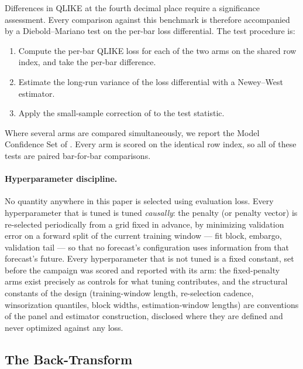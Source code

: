 Differences in QLIKE at the fourth decimal place require a significance
assessment. Every comparison against this benchmark is therefore
accompanied by a Diebold--Mariano test \citep{DieboldMariano1995} on the
per-bar loss differential. The test procedure is:
\begin{enumerate}
    \item Compute the per-bar QLIKE loss for each of the two arms on the
      shared row index, and take the per-bar difference.
    \item Estimate the long-run variance of the loss differential with a
      Newey--West estimator.
    \item Apply the small-sample correction of
      \citet{HarveyLeybourneNewbold1997} to the test statistic.
\end{enumerate}
Where several arms are compared simultaneously, we report the Model
Confidence Set of \citet{HansenLundeNason2011}. Every arm is scored on the
identical row index, so all of these tests are paired bar-for-bar
comparisons.

\paragraph{Hyperparameter discipline.} No quantity anywhere in this paper
is selected using evaluation loss. Every hyperparameter that is tuned is
tuned \emph{causally}: the penalty (or penalty vector) is re-selected
periodically from a grid fixed in advance, by minimizing validation error
on a forward split of the current training window --- fit block, embargo,
validation tail --- so that no forecast's configuration uses information
from that forecast's future. Every hyperparameter that is not tuned is a
fixed constant, set before the campaign was scored and reported with its
arm: the fixed-penalty arms exist precisely as controls for what tuning
contributes, and the structural constants of the design (training-window
length, re-selection cadence, winsorization quantiles, block widths,
estimation-window lengths) are conventions of the panel and estimator
construction, disclosed where they are defined and never optimized against
any loss.

\subsection{The Back-Transform}
\label{sec:smearing_contract}
\label{sec:smearing}
\label{sec:smearing_bias}
\label{sec:appendix_backtransform}

